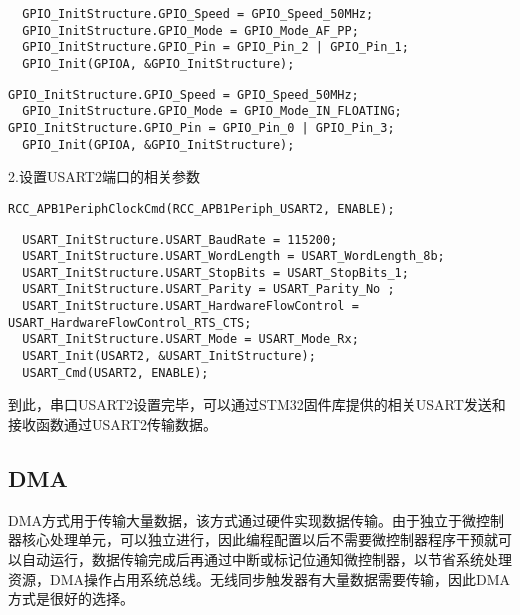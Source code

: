 \noindent\textit{\color{blue}{//设置USART2的TXD和RTS端口为端口第二功能的推挽输出(默认管脚作为普通IO口使用)}}

\begin{verbatim}
  GPIO_InitStructure.GPIO_Speed = GPIO_Speed_50MHz;
  GPIO_InitStructure.GPIO_Mode = GPIO_Mode_AF_PP; 
  GPIO_InitStructure.GPIO_Pin = GPIO_Pin_2 | GPIO_Pin_1;
  GPIO_Init(GPIOA, &GPIO_InitStructure);
\end{verbatim}

\textit{\color{blue}{//设置USART2的RXD和CTS为输入引脚}}

\begin{verbatim}
GPIO_InitStructure.GPIO_Speed = GPIO_Speed_50MHz;
  GPIO_InitStructure.GPIO_Mode = GPIO_Mode_IN_FLOATING;
GPIO_InitStructure.GPIO_Pin = GPIO_Pin_0 | GPIO_Pin_3;
  GPIO_Init(GPIOA, &GPIO_InitStructure);
\end{verbatim}

2.设置USART2端口的相关参数

\textit{\color{blue}{//使能USART2时钟}}

\verb|RCC_APB1PeriphClockCmd(RCC_APB1Periph_USART2, ENABLE);|

\textit{\color{blue}{//设置波特率为115200,8bit每次传输8bit数据长度，1停止位，无奇偶校验，采用硬件//流控，只使能输入(接收蓝牙数据)}}

\begin{verbatim}
  USART_InitStructure.USART_BaudRate = 115200;
  USART_InitStructure.USART_WordLength = USART_WordLength_8b;
  USART_InitStructure.USART_StopBits = USART_StopBits_1;
  USART_InitStructure.USART_Parity = USART_Parity_No ;
  USART_InitStructure.USART_HardwareFlowControl = USART_HardwareFlowControl_RTS_CTS;
  USART_InitStructure.USART_Mode = USART_Mode_Rx; 
  USART_Init(USART2, &USART_InitStructure);
  USART_Cmd(USART2, ENABLE);
\end{verbatim}

到此，串口USART2设置完毕，可以通过STM32固件库提供的相关USART发送和接收函数通过USART2传输数据。

\subsection{DMA}

DMA方式用于传输大量数据，该方式通过硬件实现数据传输。由于独立于微控制器核心处理单元，可以独立进行，因此编程配置以后不需要微控制器程序干预就可以自动运行，数据传输完成后再通过中断或标记位通知微控制器，以节省系统处理资源，DMA操作占用系统总线。无线同步触发器有大量数据需要传输，因此DMA方式是很好的选择。

